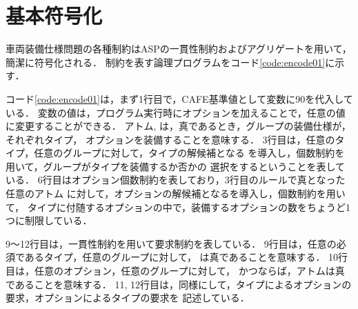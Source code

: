 







\section{基本符号化}
車両装備仕様問題の各種制約はASPの一貫性制約およびアグリゲートを用いて，簡潔に符号化される．
制約を表す論理プログラムをコード\ref{code:encode01}に示す．

コード\ref{code:encode01}は，まず1行目で，CAFE基準値として変数に90を代入している．
変数の値は，プログラム実行時にオプションを加えることで，任意の値に変更することができる．
アトム, は，真であるとき，グループの装備仕様が，それぞれタイプ，
オプションを装備することを意味する．
3行目は，任意のタイプ，任意のグループに対して，タイプの解候補となる
を導入し，個数制約を用いて，グループがタイプを装備するか否かの
選択をするということを表している．
6行目はオプション個数制約を表しており，3行目のルールで真となった任意のアトム
に対して，オプションの解候補となるを導入し，個数制約を用いて，
タイプに付随するオプションの中で，装備するオプションの数をちょうど1つに制限している．


9〜12行目は，一貫性制約を用いて要求制約を表している．
9行目は，任意の必須であるタイプ，任意のグループに対して，
は真であることを意味する．
10行目は，任意のオプション，任意のグループに対して，
かつならば，アトムは真であることを意味する．
11, 12行目は，同様にして，タイプによるオプションの要求，オプションによるタイプの要求を
記述している．


